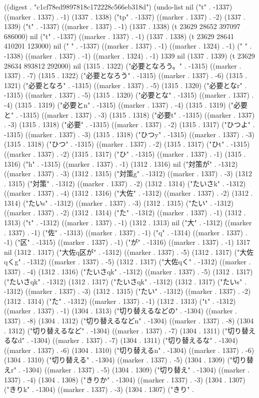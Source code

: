 
((digest . "c1cf78ed9897818c172228c566eb318d") (undo-list nil ("t" . -1337) ((marker . 1337) . -1) (1337 . 1338) ("tp" . -1337) ((marker . 1337) . -2) (1337 . 1339) ("t" . -1337) ((marker . 1337) . -1) (1337 . 1338) (t 23629 28652 397097 686000) nil ("t" . -1337) ((marker . 1337) . -1) (1337 . 1338) (t 23629 28641 410201 123000) nil ("
" . -1337) ((marker . 1337) . -1) ((marker . 1324) . -1) ("
" . -1338) ((marker . 1337) . -1) ((marker . 1324) . -1) 1339 nil (1337 . 1339) (t 23629 28634 893812 292000) nil (1315 . 1322) ("必要となろう。" . -1315) ((marker . 1337) . -7) (1315 . 1322) ("必要となろう" . -1315) ((marker . 1337) . -6) (1315 . 1321) ("必要となろ" . -1315) ((marker . 1337) . -5) (1315 . 1320) ("必要となr" . -1315) ((marker . 1337) . -5) (1315 . 1320) ("必要とな" . -1315) ((marker . 1337) . -4) (1315 . 1319) ("必要とn" . -1315) ((marker . 1337) . -4) (1315 . 1319) ("必要と" . -1315) ((marker . 1337) . -3) (1315 . 1318) ("必要t" . -1315) ((marker . 1337) . -3) (1315 . 1318) ("必要" . -1315) ((marker . 1337) . -2) (1315 . 1317) ("ひつよ" . -1315) ((marker . 1337) . -3) (1315 . 1318) ("ひつy" . -1315) ((marker . 1337) . -3) (1315 . 1318) ("ひつ" . -1315) ((marker . 1337) . -2) (1315 . 1317) ("ひt" . -1315) ((marker . 1337) . -2) (1315 . 1317) ("ひ" . -1315) ((marker . 1337) . -1) (1315 . 1316) ("h" . -1315) ((marker . 1337) . -1) (1312 . 1316) nil ("対策が" . -1312) ((marker . 1337) . -3) (1312 . 1315) ("対策g" . -1312) ((marker . 1337) . -3) (1312 . 1315) ("対策" . -1312) ((marker . 1337) . -2) (1312 . 1314) ("たいさk" . -1312) ((marker . 1337) . -4) (1312 . 1316) ("大佐" . -1312) ((marker . 1337) . -2) (1312 . 1314) ("たいs" . -1312) ((marker . 1337) . -3) (1312 . 1315) ("たい" . -1312) ((marker . 1337) . -2) (1312 . 1314) ("た" . -1312) ((marker . 1337) . -1) (1312 . 1313) ("t" . -1312) ((marker . 1337) . -1) (1312 . 1313) nil ("大" . -1312) ((marker . 1337) . -1) ("佐" . -1313) ((marker . 1337) . -1) ("q" . -1314) ((marker . 1337) . -1) ("区" . -1315) ((marker . 1337) . -1) ("が" . -1316) ((marker . 1337) . -1) 1317 nil (1312 . 1317) ("大佐q区が" . -1312) ((marker . 1337) . -5) (1312 . 1317) ("大佐qくg" . -1312) ((marker . 1337) . -5) (1312 . 1317) ("大佐qく" . -1312) ((marker . 1337) . -4) (1312 . 1316) ("たいさqk" . -1312) ((marker . 1337) . -5) (1312 . 1317) ("たいさqk" . -1312) (1312 . 1317) ("たいさqk" . -1312) (1312 . 1317) ("たいs" . -1312) ((marker . 1337) . -3) (1312 . 1315) ("たい" . -1312) ((marker . 1337) . -2) (1312 . 1314) ("た" . -1312) ((marker . 1337) . -1) (1312 . 1313) ("t" . -1312) ((marker . 1337) . -1) (1304 . 1313) ("切り替えるなどの" . -1304) ((marker . 1337) . -8) (1304 . 1312) ("切り替えるなどn" . -1304) ((marker . 1337) . -8) (1304 . 1312) ("切り替えるなど" . -1304) ((marker . 1337) . -7) (1304 . 1311) ("切り替えるなd" . -1304) ((marker . 1337) . -7) (1304 . 1311) ("切り替えるな" . -1304) ((marker . 1337) . -6) (1304 . 1310) ("切り替えるn" . -1304) ((marker . 1337) . -6) (1304 . 1310) ("切り替える" . -1304) ((marker . 1337) . -5) (1304 . 1309) ("切り替えr" . -1304) ((marker . 1337) . -5) (1304 . 1309) ("切り替え" . -1304) ((marker . 1337) . -4) (1304 . 1308) ("きりか" . -1304) ((marker . 1337) . -3) (1304 . 1307) ("きりk" . -1304) ((marker . 1337) . -3) (1304 . 1307) ("きり" . 
